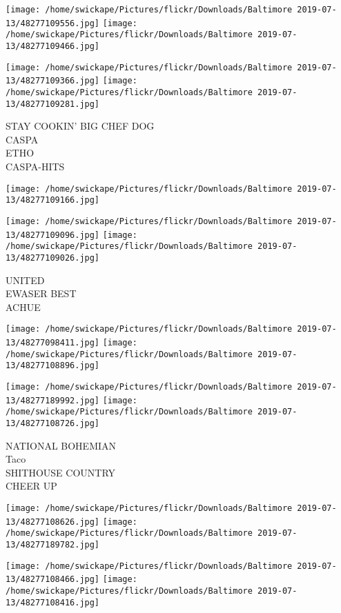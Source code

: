 \documentclass[10pt,letterpaper]{article}
\begin{document}
\texttt{[image: /home/swickape/Pictures/flickr/Downloads/Baltimore 2019-07-13/48277109556.jpg]}
\texttt{[image: /home/swickape/Pictures/flickr/Downloads/Baltimore 2019-07-13/48277109466.jpg]}

\texttt{[image: /home/swickape/Pictures/flickr/Downloads/Baltimore 2019-07-13/48277109366.jpg]}
\texttt{[image: /home/swickape/Pictures/flickr/Downloads/Baltimore 2019-07-13/48277109281.jpg]}

STAY COOKIN' BIG CHEF DOG\\
CASPA\\
ETHO\\
CASPA{-}HITS
\pagebreak

\texttt{[image: /home/swickape/Pictures/flickr/Downloads/Baltimore 2019-07-13/48277109166.jpg]}

\vspace{0.25in}
\texttt{[image: /home/swickape/Pictures/flickr/Downloads/Baltimore 2019-07-13/48277109096.jpg]}
\texttt{[image: /home/swickape/Pictures/flickr/Downloads/Baltimore 2019-07-13/48277109026.jpg]}

UNITED\\
EWASER BEST\\
ACHUE
\pagebreak

\texttt{[image: /home/swickape/Pictures/flickr/Downloads/Baltimore 2019-07-13/48277098411.jpg]}
\texttt{[image: /home/swickape/Pictures/flickr/Downloads/Baltimore 2019-07-13/48277108896.jpg]}

\texttt{[image: /home/swickape/Pictures/flickr/Downloads/Baltimore 2019-07-13/48277189992.jpg]}
\texttt{[image: /home/swickape/Pictures/flickr/Downloads/Baltimore 2019-07-13/48277108726.jpg]}

NATIONAL BOHEMIAN\\
Taco\\
SHITHOUSE COUNTRY\\
CHEER UP
\pagebreak

\texttt{[image: /home/swickape/Pictures/flickr/Downloads/Baltimore 2019-07-13/48277108626.jpg]}
\texttt{[image: /home/swickape/Pictures/flickr/Downloads/Baltimore 2019-07-13/48277189782.jpg]}

\texttt{[image: /home/swickape/Pictures/flickr/Downloads/Baltimore 2019-07-13/48277108466.jpg]}
\texttt{[image: /home/swickape/Pictures/flickr/Downloads/Baltimore 2019-07-13/48277108416.jpg]}
\end{document}
